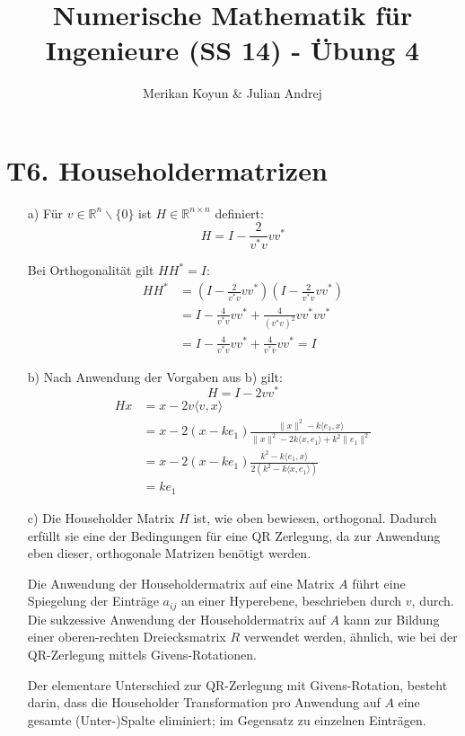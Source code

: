 \documentclass[11pt]{article}
\theoremstyle{plain}
\theoremstyle{definition}
\renewcommand{\a}{\"{a}}
\renewcommand{\o}{\"{o}}
\renewcommand{\u}{\"{u}}
\begin{document}
\title{Numerische Mathematik f\u r Ingenieure (SS 14) - \"{U}bung 4}
\author{Merikan Koyun \& Julian Andrej}
\maketitle

\section*{T6. Householdermatrizen}
\begin{itemize}
\item[a)]
F\u r $v \in \mathbb{R}^n \backslash \{0\}$ ist $H \in \mathbb{R}^{n\times n}$ definiert:
\begin{equation}
H = I - \frac{2}{v^*v} vv^*
\end{equation}

Bei Orthogonalit\a t gilt $HH^*=I$:
\begin{align}
HH^* &= \left(I-\frac{2}{v^*v}vv^*\right)\left(I-\frac{2}{v^*v}vv^*\right) \\
&=  I - \frac{4}{v^*v}vv^* + \frac{4}{(v^*v)^2} vv^*vv^* \\
&= I -\frac{4}{v^*v}vv^* + \frac{4}{v^*v}vv^* = I
\end{align}

\item[b)]
Nach Anwendung der Vorgaben aus b) gilt:
\begin{equation}
  H = I - 2vv^*
\end{equation}
\begin{align}
  Hx &= x - 2 v \langle v,x \rangle \\
     &= x - 2(x - ke_1) \frac{\|x\|^2 - k\langle e_1, x \rangle}{\|x\|^2 - 2k \langle x, e_1\rangle + k^2 \| e_1 \|^2} \\
     &= x - 2(x-ke_1) \frac{k^2 - k \langle e_1, x \rangle}{2(k^2 - k \langle x, e_1 \rangle)} \\
     &= ke_1
\end{align}

\item[c)]
Die Householder Matrix $H$ ist, wie oben bewiesen, orthogonal. Dadurch erf\u llt sie eine der Bedingungen f\u r eine QR Zerlegung, da zur Anwendung eben dieser, orthogonale Matrizen ben\o tigt werden.

Die Anwendung der Householdermatrix auf eine Matrix $A$ f\u hrt eine Spiegelung der Eintr\a ge $a_{ij}$ an einer Hyperebene, beschrieben durch $v$, durch. Die sukzessive Anwendung der Householdermatrix auf $A$ kann zur Bildung einer oberen-rechten Dreiecksmatrix $R$ verwendet werden, \a hnlich, wie bei der QR-Zerlegung mittels Givens-Rotationen. 

Der elementare Unterschied zur QR-Zerlegung mit Givens-Rotation, besteht darin, dass die Householder Transformation pro Anwendung auf $A$ eine gesamte (Unter-)Spalte eliminiert; im Gegensatz zu einzelnen Eintr\a gen.
\end{itemize}
\end{document}
